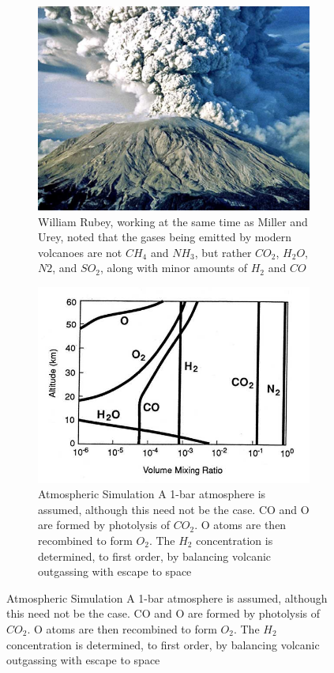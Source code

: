 \documentclass[]{article}
\begin{document}
\begin{figure}[H]
	\caption{Weakly reducing atmospheres}
	\begin{subfigure}[b]{0.45\textwidth}
		\centering
		\caption{William Rubey, working at the same time as Miller and Urey, noted that the gases being emitted by modern volcanoes are not $CH_4$ and $NH_3$, but rather $CO_2$, $H_2O$, $N2$, and $SO_2$, along with minor amounts of $H_2$ and $CO$}\label{fig:volcano}
		\includegraphics[width=\textwidth]{volcano}
	\end{subfigure}
	\begin{subfigure}[b]{0.45\textwidth}
		\centering
		\caption{Atmospheric Simulation\cite{kasting1993earth}
			A 1-bar atmosphere is assumed, although this need not be the case.
			CO and O are formed by photolysis of $CO_2$. O atoms are then recombined to form $O_2$.
			The $H_2$ concentration is determined, to first order, by 	balancing volcanic outgassing with escape to space}\label{fig:kasting}
		\includegraphics[width=\textwidth]{kasting}
	\end{subfigure}
\end{figure}
\end{document}
